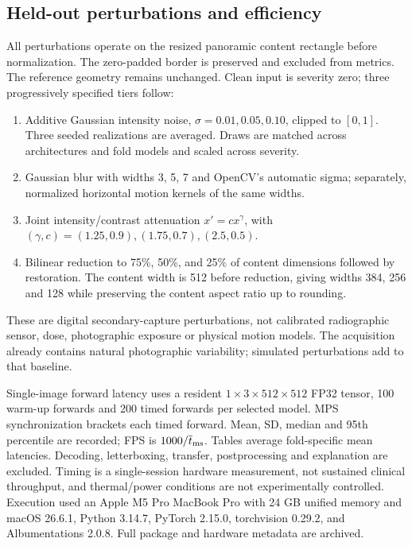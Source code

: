 \documentclass[11pt]{article}
\begin{document}
\subsection{Held-out perturbations and efficiency}
All perturbations operate on the resized panoramic content rectangle before normalization. The zero-padded border is preserved and excluded from metrics. The reference geometry remains unchanged. Clean input is severity zero; three progressively specified tiers follow:
\begin{enumerate}
\item Additive Gaussian intensity noise, $\sigma=0.01,0.05,0.10$, clipped to $[0,1]$. Three seeded realizations are averaged. Draws are matched across architectures and fold models and scaled across severity.
\item Gaussian blur with widths 3, 5, 7 and OpenCV's automatic sigma; separately, normalized horizontal motion kernels of the same widths.
\item Joint intensity/contrast attenuation $x'=cx^\gamma$, with $(\gamma,c)=(1.25,0.9),(1.75,0.7),(2.5,0.5)$.
\item Bilinear reduction to 75\%, 50\%, and 25\% of content dimensions followed by restoration. The content width is 512 before reduction, giving widths 384, 256 and 128 while preserving the content aspect ratio up to rounding.
\end{enumerate}
These are digital secondary-capture perturbations, not calibrated radiographic sensor, dose, photographic exposure or physical motion models. The acquisition already contains natural photographic variability; simulated perturbations add to that baseline.

Single-image forward latency uses a resident $1\times3\times512\times512$ FP32 tensor, 100 warm-up forwards and 200 timed forwards per selected model. MPS synchronization brackets each timed forward. Mean, SD, median and 95th percentile are recorded; FPS is $1000/\overline{t}_{\rm ms}$. Tables average fold-specific mean latencies. Decoding, letterboxing, transfer, postprocessing and explanation are excluded. Timing is a single-session hardware measurement, not sustained clinical throughput, and thermal/power conditions are not experimentally controlled. Execution used an Apple M5 Pro MacBook Pro with 24 GB unified memory and macOS 26.6.1, Python 3.14.7, PyTorch 2.15.0, torchvision 0.29.2, and Albumentations 2.0.8. Full package and hardware metadata are archived.
\end{document}

